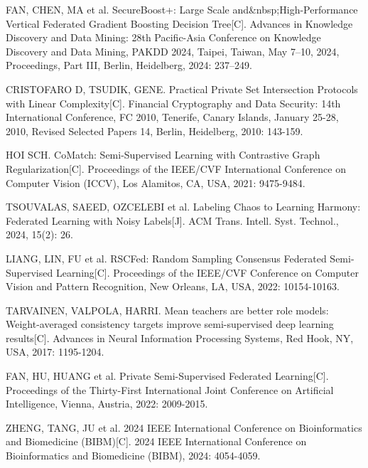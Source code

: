 \begin{thebibliography}{200}
	\wuhao %
	\linespread{1}\selectfont
	\setlength{\itemsep}{-1.4ex} %
	\thispagestyle{others}
	\pagestyle{others}
	
	\makeatletter
	\renewcommand\@biblabel[1]{[#1]\hfill} %
	\makeatother
	\setlength{\labelsep}{0cm}
	
	
	FAN, CHEN, MA et al. SecureBoost+: Large Scale and\&nbsp;High-Performance Vertical Federated Gradient Boosting Decision Tree[C]. Advances in Knowledge Discovery and Data Mining: 28th Pacific-Asia Conference on Knowledge Discovery and Data Mining, PAKDD 2024, Taipei, Taiwan, May 7–10, 2024, Proceedings, Part III, Berlin, Heidelberg, 2024: 237–249.

	CRISTOFARO D, TSUDIK, GENE. Practical Private Set Intersection Protocols with Linear Complexity[C]. Financial Cryptography and Data Security: 14th International Conference, FC 2010, Tenerife, Canary Islands, January 25-28, 2010, Revised Selected Papers 14, Berlin, Heidelberg, 2010: 143-159.

	HOI SCH. CoMatch: Semi-Supervised Learning with Contrastive Graph Regularization[C]. Proceedings of the IEEE/CVF International Conference on Computer Vision (ICCV), Los Alamitos, CA, USA, 2021: 9475-9484.

	TSOUVALAS, SAEED, OZCELEBI et al. Labeling Chaos to Learning Harmony: Federated Learning with Noisy Labels[J]. ACM Trans. Intell. Syst. Technol., 2024, 15(2): 26.

	LIANG, LIN, FU et al. RSCFed: Random Sampling Consensus Federated Semi-Supervised Learning[C]. Proceedings of the IEEE/CVF Conference on Computer Vision and Pattern Recognition, New Orleans, LA, USA, 2022: 10154-10163.

	TARVAINEN, VALPOLA, HARRI. Mean teachers are better role models: Weight-averaged consistency targets improve semi-supervised deep learning results[C]. Advances in Neural Information Processing Systems, Red Hook, NY, USA, 2017: 1195-1204.

	FAN, HU, HUANG et al. Private Semi-Supervised Federated Learning[C]. Proceedings of the Thirty-First International Joint Conference on Artificial Intelligence, Vienna, Austria, 2022: 2009-2015.

	ZHENG, TANG, JU et al. 2024 IEEE International Conference on Bioinformatics and Biomedicine (BIBM)[C]. 2024 IEEE International Conference on Bioinformatics and Biomedicine (BIBM), 2024: 4054-4059.


\end{thebibliography}
